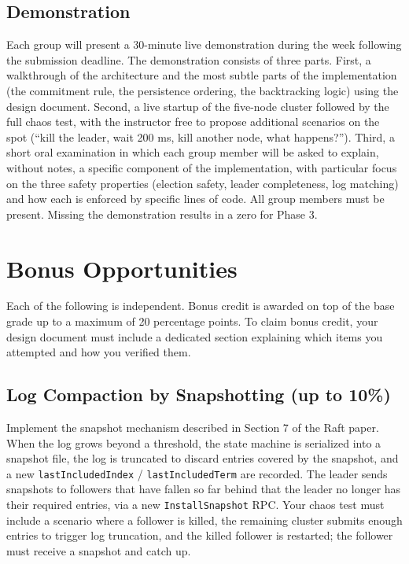 \documentclass[11pt,a4paper]{article}
\begin{document}
\subsection{Demonstration}
Each group will present a 30-minute live demonstration during the week following the submission deadline. The demonstration consists of three parts. First, a walkthrough of the architecture and the most subtle parts of the implementation (the commitment rule, the persistence ordering, the backtracking logic) using the design document. Second, a live startup of the five-node cluster followed by the full chaos test, with the instructor free to propose additional scenarios on the spot (``kill the leader, wait 200 ms, kill another node, what happens?''). Third, a short oral examination in which each group member will be asked to explain, without notes, a specific component of the implementation, with particular focus on the three safety properties (election safety, leader completeness, log matching) and how each is enforced by specific lines of code. All group members must be present. Missing the demonstration results in a zero for Phase 3.

\section{Bonus Opportunities}

Each of the following is independent. Bonus credit is awarded on top of the base grade up to a maximum of 20 percentage points. To claim bonus credit, your design document must include a dedicated section explaining which items you attempted and how you verified them.

\subsection{Log Compaction by Snapshotting (up to 10\%)}
Implement the snapshot mechanism described in Section 7 of the Raft paper. When the log grows beyond a threshold, the state machine is serialized into a snapshot file, the log is truncated to discard entries covered by the snapshot, and a new \texttt{lastIncludedIndex} / \texttt{lastIncludedTerm} are recorded. The leader sends snapshots to followers that have fallen so far behind that the leader no longer has their required entries, via a new \texttt{InstallSnapshot} RPC. Your chaos test must include a scenario where a follower is killed, the remaining cluster submits enough entries to trigger log truncation, and the killed follower is restarted; the follower must receive a snapshot and catch up.
\end{document}
